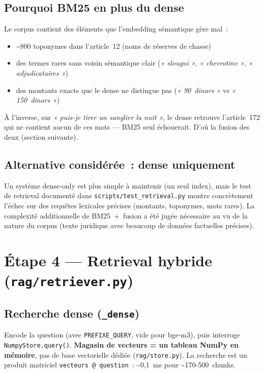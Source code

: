 \documentclass[11pt]{article}
\begin{document}
\subsection*{Pourquoi BM25 en plus du dense}

Le corpus contient des éléments que l'embedding sémantique gère mal~:

\begin{itemize}
  \item \textasciitilde800 toponymes dans l'article~12 (noms de réserves de chasse)
  \item des termes rares sans voisin sémantique clair (\textit{« slougui »}, \textit{« chevrotine »}, \textit{« adjudicataires »})
  \item des montants exacts que le dense ne distingue pas (\textit{« 90~dinars »} vs \textit{« 150~dinars »})
\end{itemize}

À l'inverse, sur \textit{« puis-je tirer un sanglier la nuit »}, le dense retrouve l'article~172 qui
ne contient aucun de ces mots --- BM25 seul échouerait. D'où la fusion des deux (section suivante).

\subsection*{Alternative considérée~: dense uniquement}

Un système dense-only est plus simple à maintenir (un seul index), mais le test de retrieval
documenté dans \texttt{scripts/test\_retrieval.py} montre concrètement l'échec sur des requêtes
lexicales précises (montants, toponymes, mots rares). La complexité additionnelle de BM25~+~fusion
a été jugée nécessaire au vu de la nature du corpus (texte juridique avec beaucoup de données
factuelles précises).

\section{Étape 4 --- Retrieval hybride (\texttt{rag/retriever.py})}

\subsection{Recherche dense (\texttt{\_dense})}

Encode la question (avec \texttt{PREFIXE\_QUERY}, vide pour bge-m3), puis interroge
\texttt{NumpyStore.query()}. \textbf{Magasin de vecteurs = un tableau NumPy en mémoire}, pas de
base vectorielle dédiée (\texttt{rag/store.py}). La recherche est un produit matriciel
\texttt{vecteurs @ question}~: \textasciitilde0,1~ms pour \textasciitilde170-500~chunks.
\end{document}
